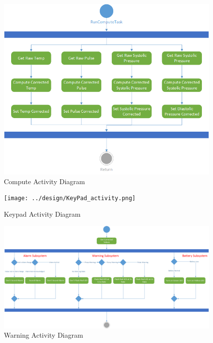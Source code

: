 \documentclass[12pt]{article} %
\begin{document}
    \begin{figure}[H]
      \centering
      \includegraphics[width=\textwidth]{../design/compute_activity.png}
      \caption{Compute Activity Diagram}
      \label{fig:computeActivity}
    \end{figure}

    \begin{figure}[H]
      \centering
      \texttt{[image: ../design/KeyPad\_activity.png]}
      \caption{Keypad Activity Diagram}
      \label{fig:keyPadActivity}
    \end{figure}

    \begin{figure}[H]
      \centering
      \includegraphics[width=\textwidth]{../design/warning_activity.png}
      \caption{Warning Activity Diagram}
      \label{fig:warningActivity}
    \end{figure}
\end{document}
